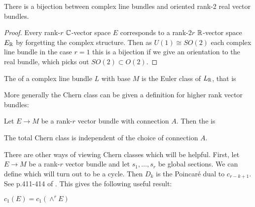 \documentclass{article}
\begin{document}
\begin{lemma}
	There is a bijection between complex line bundles  and oriented rank-2 real vector bundles.
\end{lemma}
\begin{proof}
	Every rank-$r$ $\mathbb{C}$-vector space $E$ corresponds to a rank-$2r$ $\mathbb{R}$-vector space $E_{\mathbb{R}}$  by forgetting the complex structure. Then as $U(1) \cong SO(2)$ each complex line bundle in the case $r=1$ this is a bijection if we give an orientation to the real bundle, which picks out $SO(2) \subset O(2)$.
\end{proof}

\begin{definition}
	The  of a complex line bundle $L$ with base $M$ is the Euler class of $L_{\mathbb{R}}$, that is 
\end{definition}

More generally the Chern class can be given a definition for higher rank vector bundles:
\begin{definition}
	Let $E \to M$ be a rank-$r$ vector bundle with connection $A$. Then the  is 
\end{definition}
\begin{prop}
	The total Chern class is independent of the choice of connection $A$. 
\end{prop}

	There are other ways of viewing Chern classes which will be helpful. First, let $E \to M$ be a rank-$r$ vector bundle and let $s_1, \dots, s_r$ be global sections. We can define
which will turn out to be a cycle. Then $D_k$ is the Poincar\'e dual to $c_{r-k+1}$. See p.411-414 of \cite{Griffiths2014}. This gives the following useful result:
\begin{prop}
	$c_1(E) = c_1(\wedge^r E)$
\end{prop}
\end{document}
